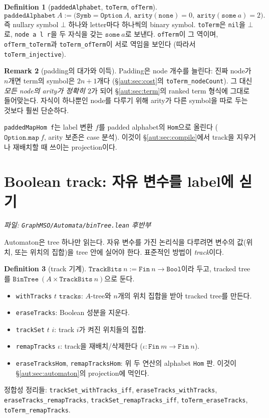 \documentclass[11pt]{article}
\theoremstyle{definition}
\newtheorem{definition}{Definition}[section]
\newtheorem{remark}[definition]{Remark}
\theoremstyle{plain}
\newcommand{\lean}[1]{\texttt{#1}}
\newcommand{\leanfile}[1]{\texttt{#1}}
\begin{document}
\begin{definition}[\lean{paddedAlphabet}, \lean{toTerm}, \lean{ofTerm}]
\label{aut:def:padded}
\[
  \lean{paddedAlphabet}\ A := \bigl(\lean{Symb} = \lean{Option}\ A,\
    \lean{arity}(\lean{none}) = 0,\ \lean{arity}(\lean{some}\ a) = 2\bigr).
\]
즉 nullary symbol $\bot$ 하나와 letter마다 하나씩의 binary symbol.
\lean{toTerm}은 \lean{nil}을 $\bot$로, \lean{node a l r}을 두 자식을 갖는
$\lean{some}\ a$로 보낸다. \lean{ofTerm}이 그 역이며,
\lean{ofTerm\_toTerm}과 \lean{toTerm\_ofTerm}이 서로 역임을 보인다
(따라서 \lean{toTerm\_injective}).
\end{definition}

\begin{remark}[padding의 대가와 이득]
Padding은 node 개수를 늘린다: 진짜 node가 $n$개면 term의 symbol은
$2n+1$개다 (\S\ref{aut:sec:cost}의 \lean{toTerm\_nodeCount}).
그 대신 \emph{모든 node의 arity가 정확히 $2$}가 되어
\S\ref{aut:sec:term}의 ranked term 형식에 그대로 들어맞는다. 자식이 하나뿐인
node를 다루기 위해 arity가 다른 symbol을 따로 두는 것보다 훨씬 단순하다.

\lean{paddedMapHom f}는 label 변환 $f$를 padded alphabet의 \lean{Hom}으로
올린다 ($\lean{Option.map}\ f$, arity 보존은 case 분석). 이것이
\S\ref{aut:sec:compile}에서 track을 지우거나 재배치할 때 쓰이는 projection이다.
\end{remark}

\section{Boolean track: 자유 변수를 label에 싣기}
\label{aut:sec:tracks}

\emph{파일: \leanfile{GraphMSO/Automata/binTree.lean} 후반부}

Automaton은 tree 하나만 읽는다. 자유 변수를 가진 논리식을 다루려면 변수의
값(위치, 또는 위치의 집합)을 tree 안에 실어야 한다. 표준적인 방법이
\emph{track}이다.

\begin{definition}[track 기계]
\label{aut:def:tracks}
$\lean{TrackBits}\ n := \lean{Fin}\ n \to \lean{Bool}$이라 두고, tracked tree를
$\lean{BinTree}\ (A \times \lean{TrackBits}\ n)$으로 둔다.
\begin{itemize}
  \item \lean{withTracks} $t$ $\lean{tracks}$: $A$-tree와 $n$개의 위치 집합을
    받아 tracked tree를 만든다.
  \item \lean{eraseTracks}: Boolean 성분을 지운다.
  \item \lean{trackSet} $t$ $i$: track $i$가 켜진 위치들의 집합.
  \item \lean{remapTracks} $\iota$: track을 재배치/삭제한다
    ($\iota : \lean{Fin}\ m \to \lean{Fin}\ n$).
  \item \lean{eraseTracksHom}, \lean{remapTracksHom}: 위 두 연산의
    alphabet \lean{Hom} 판. 이것이 \S\ref{aut:sec:automaton}의 projection에
    먹인다.
\end{itemize}
정합성 정리들: \lean{trackSet\_withTracks\_iff},
\lean{eraseTracks\_withTracks}, \lean{eraseTracks\_remapTracks},
\lean{trackSet\_remapTracks\_iff}, \lean{toTerm\_eraseTracks},
\lean{toTerm\_remapTracks}.
\end{definition}
\end{document}
